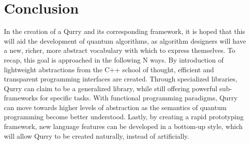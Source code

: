 \documentclass[journal]{IEEEtran}
\begin{document}
\section{Conclusion}

In the creation of a Qurry and its corresponding framework, it is hoped that this will aid the development of quantum algorithms, as algorithm designers will have a new, richer, more abstract vocabulary with which to express themselves.
To recap, this goal is approached in the following N ways.
By introduction of lightweight abstractions from the C++ school of thought, efficient and transparent programming interfaces are created.
Through specialized libraries, Qurry can claim to be a generalized library, while still offering powerful sub-frameworks for specific tasks.
With functional programming paradigms, Qurry can move towards higher levels of abstraction as the semantics of quantum programming become better understood.
Lastly, by creating a rapid prototyping framework, new language features can be developed in a bottom-up style, which will allow Qurry to be created naturally, instead of artificially.
\end{document}
